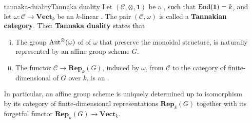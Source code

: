 \begin{topic}{tannaka-duality}{Tannaka duality}
    Let $(\mathcal{C}, \otimes, \textbf{1})$ be a   , such that $\textup{End}(\textbf{1}) = k$, and let $\omega : \mathcal{C} \to \textbf{Vect}_k$ be an   $k$-linear  . The pair $(\mathcal{C}, \omega)$ is called a \textbf{Tannakian category}. Then \textbf{Tannaka duality} states that
    \begin{enumerate}[(i)]
        \item The group $\textup{Aut}^\otimes(\omega)$ of  of $\omega$ that preserve the monoidal structure, is naturally represented by an affine group scheme $G$.
        \item The functor $\mathcal{C} \to \textbf{Rep}_k(G)$, induced by $\omega$, from $\mathcal{C}$ to the category of finite-dimensional  of $G$ over $k$, is an .
    \end{enumerate}
    In particular, an affine group scheme is uniquely determined up to isomorphism by its category of finite-dimensional representations $\textbf{Rep}_k(G)$ together with its forgetful functor $\textbf{Rep}_k(G) \to \textbf{Vect}_k$.
\end{topic}


